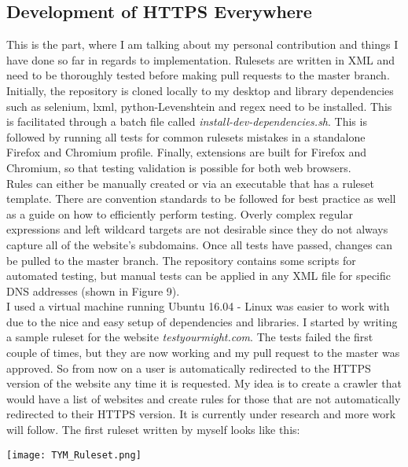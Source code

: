 \documentclass[a4paper, 12pt, titlepage]{article}
\begin{document}
\subsection{Development of HTTPS Everywhere}
This is the part, where I am talking about my personal contribution and things I have done so far in regards to implementation. Rulesets are written in XML and need to be thoroughly tested before making pull requests to the master branch. Initially, the repository is cloned locally to my desktop and library dependencies such as selenium, lxml, python-Levenshtein and regex need to be installed. This is facilitated through a batch file called \textit{install-dev-dependencies.sh}. This is followed by running all tests for common rulesets mistakes in a standalone Firefox and Chromium profile. Finally, extensions are built for Firefox and Chromium, so that testing validation is possible for both web browsers. \\[6pt]
Rules can either be manually created or via an executable that has a ruleset template. There are convention standards to be followed for best practice as well as a guide on how to efficiently perform testing. Overly complex regular expressions and left wildcard targets are not desirable since they do not always capture all of the website's subdomains. Once all tests have passed, changes can be pulled to the master branch. The repository contains some scripts for automated testing, but manual tests can be applied in any XML file for specific DNS addresses (shown in Figure 9). \\[6pt]
I used a virtual machine running Ubuntu 16.04 - Linux was easier to work with due to the nice and easy setup of dependencies and libraries. I started by writing a sample ruleset for the website \textit{testyourmight.com}. The tests failed the first couple of times, but they are now working and my pull request to the master was approved. So from now on a user is automatically redirected to the HTTPS version of the website any time it is requested. My idea is to create a crawler that would have a list of websites and create rules for those that are not automatically redirected to their HTTPS version. It is currently under research and more work will follow. The first ruleset written by myself looks like this:

\begin{center}
\texttt{[image: TYM\_Ruleset.png]}
\label{fig:TYMRuleset}
\end{center}
\end{document}
